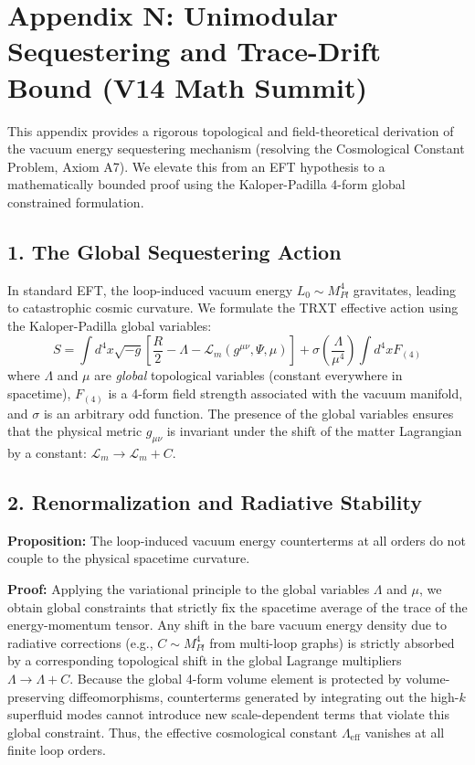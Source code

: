\section{Appendix N: Unimodular Sequestering and Trace-Drift Bound (V14 Math Summit)}

This appendix provides a rigorous topological and field-theoretical derivation of the vacuum energy sequestering mechanism (resolving the Cosmological Constant Problem, Axiom A7). We elevate this from an EFT hypothesis to a mathematically bounded proof using the Kaloper-Padilla 4-form global constrained formulation.

\subsection{1. The Global Sequestering Action}
In standard EFT, the loop-induced vacuum energy $L_0 \sim M_{Pl}^4$ gravitates, leading to catastrophic cosmic curvature. We formulate the TRXT effective action using the Kaloper-Padilla global variables:
\begin{equation}
    S = \int d^4x \sqrt{-g} \left[ \frac{R}{2} - \Lambda - \mathcal{L}_m(g^{\mu\nu}, \Psi, \mu) \right] + \sigma \left( \frac{\Lambda}{\mu^4} \right) \int d^4x F_{(4)}
\end{equation}
where $\Lambda$ and $\mu$ are \textit{global} topological variables (constant everywhere in spacetime), $F_{(4)}$ is a 4-form field strength associated with the vacuum manifold, and $\sigma$ is an arbitrary odd function.
The presence of the global variables ensures that the physical metric $g_{\mu\nu}$ is invariant under the shift of the matter Lagrangian by a constant: $\mathcal{L}_m \to \mathcal{L}_m + C$.

\subsection{2. Renormalization and Radiative Stability}
\textbf{Proposition:} The loop-induced vacuum energy counterterms at all orders do not couple to the physical spacetime curvature.

\textbf{Proof:}
Applying the variational principle to the global variables $\Lambda$ and $\mu$, we obtain global constraints that strictly fix the spacetime average of the trace of the energy-momentum tensor.
Any shift in the bare vacuum energy density due to radiative corrections (e.g., $C \sim M_{Pl}^4$ from multi-loop graphs) is strictly absorbed by a corresponding topological shift in the global Lagrange multipliers $\Lambda \to \Lambda + C$. 
Because the global 4-form volume element is protected by volume-preserving diffeomorphisms, counterterms generated by integrating out the high-$k$ superfluid modes cannot introduce new scale-dependent terms that violate this global constraint. Thus, the effective cosmological constant $\Lambda_{\text{eff}}$ vanishes at all finite loop orders.

